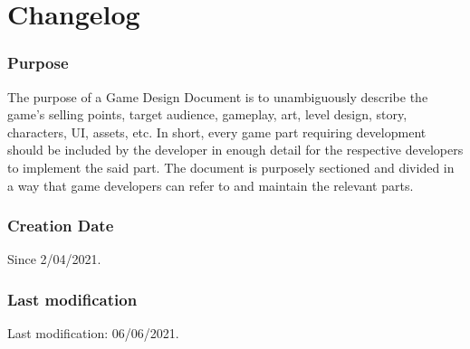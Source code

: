 \section*{Changelog}

\subsubsection*{Purpose}
The purpose of a Game Design Document is to unambiguously describe the game's selling points, target audience, gameplay, art, level design, story, characters, UI, assets, etc. In short, every game part requiring development should be included by the developer in enough detail for the respective developers to implement the said part. The document is purposely sectioned and divided in a way that game developers can refer to and maintain the relevant parts.

\subsubsection*{Creation Date}
Since 2/04/2021.

\subsubsection*{Last modification}
Last modification: 06/06/2021.\\

